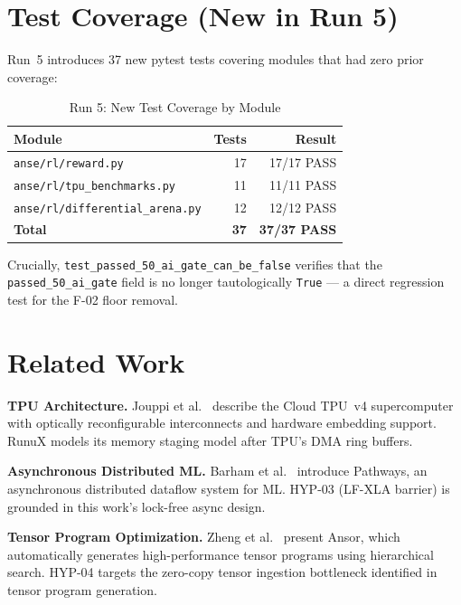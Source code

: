 \documentclass[10pt,twocolumn]{article}
\begin{document}
\section{Test Coverage (New in Run 5)}

Run~5 introduces 37 new pytest tests covering modules that had
zero prior coverage:

\begin{table}[ht]
\centering
\caption{Run 5: New Test Coverage by Module}
\label{tab:tests}
\small
\begin{tabular}{lrr}
\toprule
\textbf{Module} & \textbf{Tests} & \textbf{Result} \\
\midrule
\texttt{anse/rl/reward.py} & 17 & 17/17 PASS \\
\texttt{anse/rl/tpu\_benchmarks.py} & 11 & 11/11 PASS \\
\texttt{anse/rl/differential\_arena.py} & 12 & 12/12 PASS \\
\midrule
\textbf{Total} & \textbf{37} & \textbf{37/37 PASS} \\
\bottomrule
\end{tabular}
\end{table}

Crucially, \texttt{test\_passed\_50\_ai\_gate\_can\_be\_false} verifies
that the \texttt{passed\_50\_ai\_gate} field is no longer tautologically
\texttt{True} — a direct regression test for the F-02 floor removal.

\section{Related Work}

\textbf{TPU Architecture.}
Jouppi et al.~\cite{jouppi2023tpuv4} describe the Cloud TPU~v4 supercomputer
with optically reconfigurable interconnects and hardware embedding support.
RunuX models its memory staging model after TPU's DMA ring buffers.

\textbf{Asynchronous Distributed ML.}
Barham et al.~\cite{barham2022pathways} introduce Pathways, an asynchronous
distributed dataflow system for ML. HYP-03 (LF-XLA barrier) is grounded
in this work's lock-free async design.

\textbf{Tensor Program Optimization.}
Zheng et al.~\cite{zheng2020ansor} present Ansor, which automatically generates
high-performance tensor programs using hierarchical search. HYP-04 targets
the zero-copy tensor ingestion bottleneck identified in tensor program generation.
\end{document}
